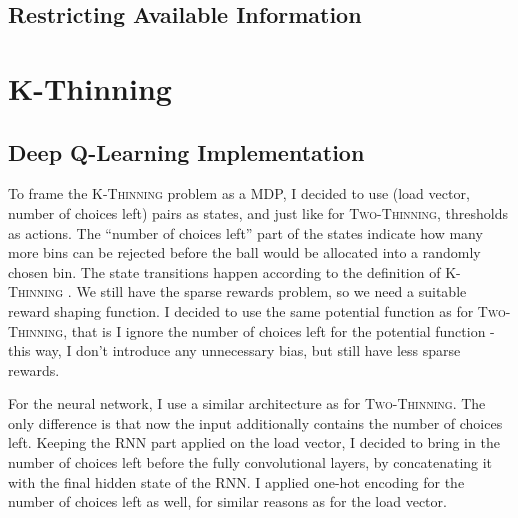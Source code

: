 
\subsection{Restricting Available Information} \label{lesssharedstate}







\section{K-Thinning}


\subsection{Deep Q-Learning Implementation}


To frame the \textsc{K-Thinning} problem as a MDP, I decided to use (load vector, number of choices left) pairs as states, and just like for \textsc{Two-Thinning}, thresholds as actions. The ``number of choices left'' part of the states indicate how many more bins can be rejected before the ball would be allocated into a randomly chosen bin. The state transitions happen according to the definition of \textsc{K-Thinning} . We still have the sparse rewards problem, so we need a suitable reward shaping function. I decided to use the same potential function as for \textsc{Two-Thinning}, that is I ignore the number of choices left for the potential function - this way, I don't introduce any unnecessary bias, but still have less sparse rewards. 


For the neural network, I use a similar architecture as for \textsc{Two-Thinning}. The only difference is that now the input additionally contains the number of choices left. Keeping the RNN part applied on the load vector, I decided to bring in the number of choices left before the fully convolutional layers, by concatenating it with the final hidden state of the RNN. I applied one-hot encoding for the number of choices left as well, for similar reasons as for the load vector.


